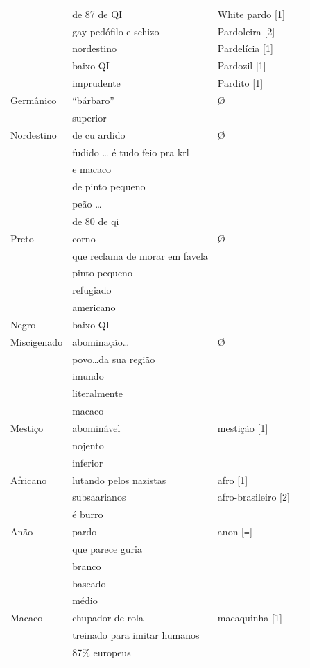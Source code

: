 \documentclass[portuguese]{textolivre}
\begin{document}
\begin{longtable}{llll}
 & de 87 de QI & White pardo {[}1{]} \\ 
 & gay pedófilo e schizo & Pardoleira {[}2{]} \\ 
 & nordestino & Pardelícia {[}1{]} \\ 
 & baixo QI & Pardozil {[}1{]} \\ 
 & imprudente & Pardito {[}1{]} \\
 \midrule
Germânico & “bárbaro” & Ø \\  
 & superior \\
 \midrule
Nordestino & de cu ardido & Ø \\ 
 & fudido … é tudo feio pra krl \\
 & e macaco\\ 
 & de pinto pequeno\\ 
 & peão …\\ 
 & de 80 de qi \\
 \midrule
Preto & corno &  Ø \\ 
 & que reclama de morar em favela\\ 
 & pinto pequeno \\ 
 & refugiado\\ 
 & americano \\
 \midrule
Negro & baixo QI  \\
\midrule
Miscigenado & abominação… & Ø \\ 
 & povo…da sua região\\ 
 & imundo\\
 & literalmente\\ 
 & macaco \\
 \midrule
Mestiço & abominável & mestição {[}1{]}\\ 
 & nojento \\ 
 & inferior \\
 \midrule
Africano & lutando pelos nazistas & afro {[}1{]} \\
 & subsaarianos & afro-brasileiro {[}2{]} \\ 
 & é burro \\
 \midrule
Anão & pardo & anon {[}≡{]} \\ 
 & que parece guria \\ 
 & branco\\ 
 & baseado\\ 
 & médio \\
 \midrule
Macaco & chupador de rola & macaquinha {[}1{]} \\
 & treinado para imitar humanos \\ 
 & 87\% europeus\\ 

\end{longtable}
\end{document}
